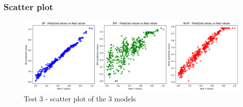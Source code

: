 \documentclass[11pt, a4paper]{article}
\begin{document}
\subsubsection{Scatter plot}

\begin{figure}[H]
    \centering
    \includegraphics[width=400pt]{images/test3_scatter.png}
    \caption{Test 3 - scatter plot of the 3 models}
    \label{fig:image_scatter_comparison_3}
\end{figure}


\newpage
\end{document}
